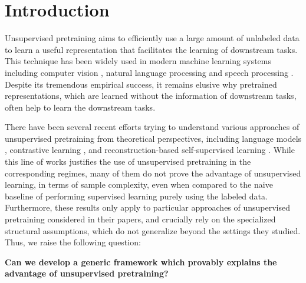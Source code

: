 \section{Introduction}
Unsupervised pretraining aims to efficiently use a large amount of unlabeled data to learn a useful representation that facilitates the learning of downstream tasks. This technique has been widely used in modern machine learning systems including computer vision \citep{caron2019unsupervised,dai2021up}, natural language processing \citep{radford2018improving, devlin2018bert,song2019mass} and speech processing \citep{schneider2019wav2vec,baevski2020wav2vec}. 
Despite its tremendous empirical success, it remains elusive why pretrained representations, which are learned without the information of downstream tasks, often help to learn the downstream tasks.

There have been several recent efforts trying to understand various approaches of unsupervised pretraining from theoretical perspectives, including language models \cite{saunshi2020mathematical, wei2021pretrained}, contrastive learning \cite{arora2019theoretical, tosh2021contrastive2, tosh2021contrastive, haochen2021provable, saunshi2022understanding}, and reconstruction-based self-supervised learning \cite{lee2021predicting}. While this line of works justifies the use of unsupervised pretraining in the corresponding regimes, many of them do not prove the advantage of unsupervised learning, in terms of sample complexity, even when compared to the naive baseline of performing supervised learning purely using the labeled data. Furthermore, these results only apply to particular approaches of unsupervised pretraining considered in their papers, and crucially rely on the specialized structural assumptions, which do not generalize beyond the settings they studied. Thus, we raise the following question:

\textbf{Can we develop a generic framework which provably explains the advantage of unsupervised pretraining?}



